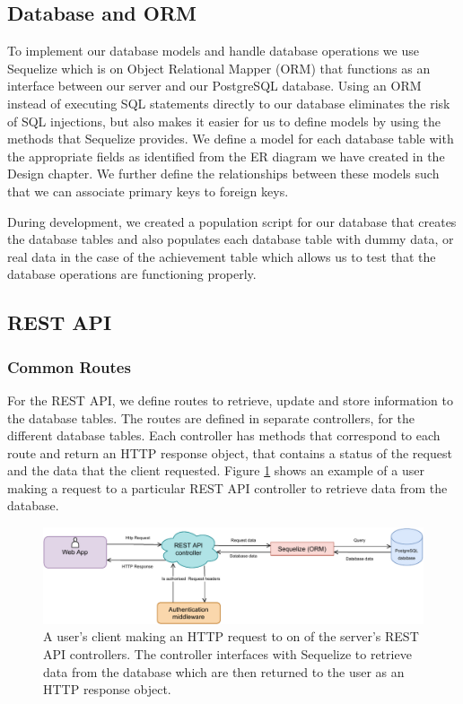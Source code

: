 \documentclass{l4proj}
\begin{document}
\subsection{Database and ORM}
To implement our database models and handle database operations we use Sequelize which is on Object Relational Mapper (ORM) that functions as an interface between our server and our PostgreSQL database. Using an ORM instead of executing SQL statements directly to our database eliminates the risk of SQL injections, but also makes it easier for us to define models by using the methods that Sequelize provides. We define a model for each database table with the appropriate fields as identified from the ER diagram we have created in the Design chapter. We further define the relationships between these models such that we can associate primary keys to foreign keys.

During development, we created a population script for our database that creates the database tables and also populates each database table with dummy data, or real data in the case of the achievement table which allows us to test that the database operations are functioning properly. 

\subsection{REST API}

\subsubsection{Common Routes}
For the REST API, we define routes to retrieve, update and store information to the database tables. The routes are defined in separate controllers, for the different database tables. Each controller has methods that correspond to each route and return an HTTP response object, that contains a status of the request and the data that the client requested. Figure \ref{fig:restapi} shows an example of a user making a request to a particular REST API controller to retrieve data from the database.

\begin{figure}
    \centering
    \includegraphics[width=1\linewidth]{images/restapi.pdf}    

    \caption{A user's client making an HTTP request to on of the server's REST API controllers. The controller interfaces with Sequelize to retrieve data from the database which are then returned to the user as an HTTP response object.}

    \label{fig:restapi} 
\end{figure}
\end{document}
